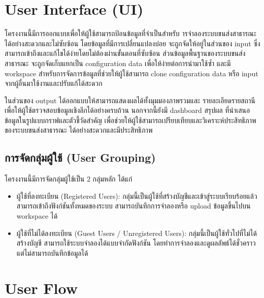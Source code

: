 \section{User Interface (UI)}
\begin{mypara}
    \indent โครงงานนี้มีการออกแบบเพื่อให้ผู้ใช้สามารถป้อนข้อมูลที่จำเป็นสำหรับ
    ารจำลองระบบขนส่งสาธารณะได้อย่างสะดวกและไม่ซับซ้อน 
    โดยข้อมูลที่มีการเปลี่ยนแปลงบ่อย จะถูกจัดให้อยู่ในส่วนของ input 
    ซึ่งสามารถเข้าถึงและแก้ไขได้ง่ายโดยไม่ต้องผ่านขั้นตอนที่ซับซ้อน 
    ส่วนข้อมูลพื้นฐานของระบบขนส่งสาธารณะ จะถูกจัดเก็บแยกเป็น configuration data 
    เพื่อให้ง่ายต่อการนำมาใช้ซ้ำ และมี workspace สำหรับการจัดการข้อมูลที่ช่วยให้ผู้ใช้สามารถ 
    clone configuration data หรือ input จากผู้อื่นมาใช้งานและปรับแก้ได้สะดวก

  \indent ในส่วนของ output ได้ออกแบบให้สามารถแสดงผลได้ทั้งมุมมองภาพรวมและ
  รายละเอียดรายสถานี เพื่อให้ผู้ใช้ตรวจสอบข้อมูลเชิงลึกได้อย่างครบถ้วน นอกจากนี้ยังมี 
  dashboard สรุปผล ที่นำเสนอข้อมูลในรูปแบบกราฟและตัวชี้วัดสำคัญ 
  เพื่อช่วยให้ผู้ใช้สามารถเปรียบเทียบและวิเคราะห์ประสิทธิภาพของระบบขนส่งสาธารณะ
  ได้อย่างสะดวกและมีประสิทธิภาพ
\end{mypara}

\subsection{การจัดกลุ่มผู้ใช้ (User Grouping)}
\begin{mypara}
\indent โครงงานนี้มีการจัดกลุ่มผู้ใช้เป็น 2 กลุ่มหลัก ได้แก่
\begin{itemize}
    \item ผู้ใช้ที่ลงทะเบียน (Registered Users): กลุ่มนี้เป็นผู้ใช้ที่สร้างบัญชีและเข้าสู่ระบบเรียบร้อยแล้ว 
    สามารถเข้าถึงฟังก์ชันทั้งหมดของระบบ สามารถบันทึกการจำลองหรือ upload ข้อมูลขึ้นไปบน workspace ได้ 
    \item ผู้ใช้ที่ไม่ได้ลงทะเบียน (Guest Users / Unregistered Users): กลุ่มนี้เป็นผู้ใช้ทั่วไปที่ไม่ได้สร้างบัญชี 
    สามารถใช้ระบบจำลองได้แบบจำกัดฟังก์ชัน โดยทำการจำลองและดูผลลัพธ์ได้ชั่วคราว 
    แต่ไม่สามารถบันทึกข้อมูลได้
\end{itemize}
\end{mypara}
\section{User Flow}

